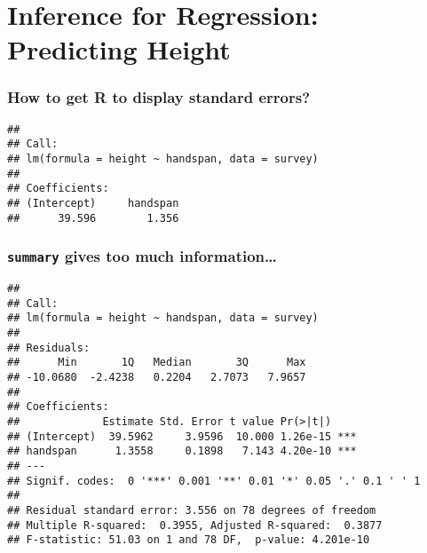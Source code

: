 \section{Inference for Regression: Predicting Height}
\begin{frame}[fragile]
  \frametitle{How to get R to display standard errors?}
  \small
\begin{knitrout}
\color{fgcolor}\begin{kframe}
\begin{alltt}
 \hlkwb{<-} 
 \hlkwb{<-} 
 \hlkwb{<-} 
 \hlkwb{<-}  \hlopt{~}   
 
\end{alltt}
\begin{verbatim}
## 
## Call:
## lm(formula = height ~ handspan, data = survey)
## 
## Coefficients:
## (Intercept)     handspan  
##      39.596        1.356
\end{verbatim}
\end{kframe}
\end{knitrout}
\end{frame}
\begin{frame}[fragile]
  \frametitle{\texttt{summary} gives too much information\dots}
  \tiny
\begin{knitrout}
\color{fgcolor}\begin{kframe}
\begin{alltt}
\end{alltt}
\begin{verbatim}
## 
## Call:
## lm(formula = height ~ handspan, data = survey)
## 
## Residuals:
##      Min       1Q   Median       3Q      Max 
## -10.0680  -2.4238   0.2204   2.7073   7.9657 
## 
## Coefficients:
##             Estimate Std. Error t value Pr(>|t|)    
## (Intercept)  39.5962     3.9596  10.000 1.26e-15 ***
## handspan      1.3558     0.1898   7.143 4.20e-10 ***
## ---
## Signif. codes:  0 '***' 0.001 '**' 0.01 '*' 0.05 '.' 0.1 ' ' 1
## 
## Residual standard error: 3.556 on 78 degrees of freedom
## Multiple R-squared:  0.3955,	Adjusted R-squared:  0.3877 
## F-statistic: 51.03 on 1 and 78 DF,  p-value: 4.201e-10
\end{verbatim}
\end{kframe}
\end{knitrout}
\end{frame}
